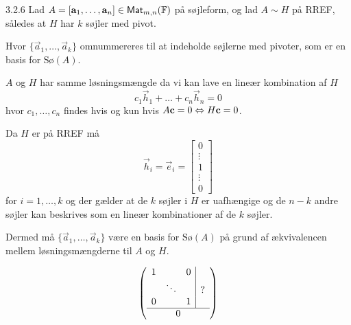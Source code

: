 \begin{saetning}{3.2.6}
	Lad $A = [\mathbf{a}_1, \dotsc, \mathbf{a}_n] \in
	\textsf{Mat}_{m,n}(\mathbb{F})$ på søjleform, og lad $A \sim H$ på RREF, således at
	$H$ har $k$ søjler med pivot.
	
	Hvor $\{\vec{a}_1, \dotsc, \vec{a}_k\}$ omnummereres til at indeholde
	søjlerne med pivoter, som er en basis for $\text{Sø}(A)$.
\end{saetning}

\begin{bevis}
	$A$ og $H$ har samme løsningsmængde da vi kan lave en lineær kombination af
	$H$
	\[
		c_1 \vec{h}_1 + \dotso + c_n \vec{h}_n = 0
	\]
	hvor $c_1,\dotsc,c_n$ findes hvis og kun hvis $A \mathbf{c} = 0 \Leftrightarrow H \mathbf{c}
	= 0$.

	Da $H$ er på RREF må
	\[
		\vec{h}_i = \vec{e}_i = \begin{bmatrix}
			0 \\
			\vdots \\
			1 \\
			\vdots \\
			0
		\end{bmatrix}
	\]
	for $i=1,\dotsc,k$ og der gælder at de $k$ søjler i $H$ er uafhængige og 
	de $n-k$ andre søjler kan beskrives som en lineær kombinationer af de $k$
	søjler.
	
	Dermed må $\{\vec{a}_1, \dotsc, \vec{a}_k\}$ være en basis for
	$\text{Sø}(A)$ på grund af ækvivalencen mellem løsningsmængderne til $A$ og
	$H$.
\end{bevis}

\[
	\left( \begin{array}{cccc}
		1 &        & 0 & \multicolumn{1}{|c}{} \\
		  & \ddots &   & \multicolumn{1}{|c}{?} \\
		0 &        & 1 & \multicolumn{1}{|c}{} \\
		\hline 
		\multicolumn{4}{c}{0}
	\end{array} \right)
\]

